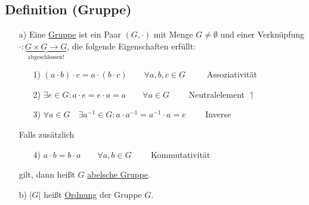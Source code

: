 \documentclass[a4paper, 12pt,titlepage, pdf, headsepline]{article}
\newcommand{\uline}[1]{\underline{#1}}
\renewcommand{\>}{\rightarrow}
\renewcommand{\*}{\cdot}
\begin{document}
\subsection{Definition (Gruppe)}
\label{3.9}
\begin{itemize}
	\item[a)] Eine \uline{Gruppe} ist ein Paar $(G, \cdot) $ mit Menge $G \neq \emptyset$ und einer Verknüpfung $\cdot : \underbrace{G \times G \rightarrow G}_{\text{abgeschlossen!}}$, die folgende Eigenschaften erfüllt:
	      \begin{itemize}
	      	\item[1)] $(a \cdot b) \cdot c = a \cdot (b \cdot c) \qquad \forall a,b,c \in G\qquad~$ Assoziativität
	      	\item[2)] $\exists e \in G: a \cdot e = e \cdot a = a \qquad \forall a \in G\qquad$ Neutralelement $\upharpoonleft$
	      	\item[3)] $\forall a \in G\quad \exists a^{-1} \in G: a \cdot a^{-1} = a^{-1}\*a = e\qquad$ Inverse
	      \end{itemize}
	      Falls zusätzlich 
	      \begin{itemize}
	      	\item[4)] $a \cdot b = b \cdot a \qquad  \forall a,b \in G\qquad$ Kommutativität \end{itemize}
	      	      gilt, dann heißt $G$ \uline{abelsche Gruppe}.
	      	      		
	      	\item[b)] $| G |$ heißt \uline{Ordnung} der Gruppe $G$.
	      \end{itemize}
\end{document}

